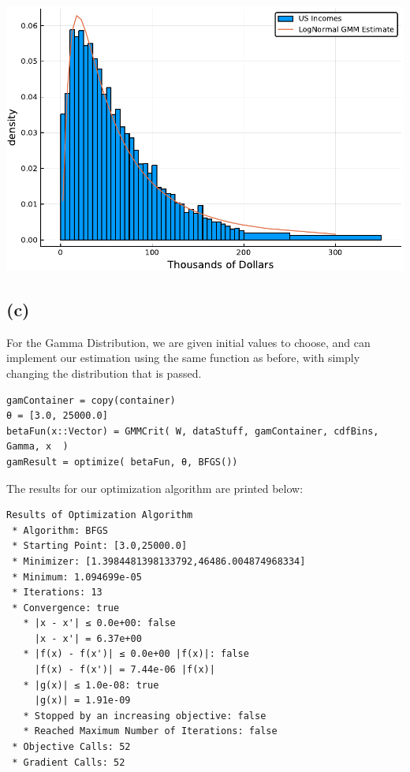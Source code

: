 \documentclass[12pt]{paper}
\begin{document}
\begin{centering}
  \includegraphics{loggyboy.pdf}
\end{centering}

\subsection{(c)}

For the Gamma Distribution, we are given initial values to choose, and
can implement our estimation using the same function as before, with
simply changing the distribution that is passed.

\begin{verbatim}
gamContainer = copy(container)
θ = [3.0, 25000.0]
betaFun(x::Vector) = GMMCrit( W, dataStuff, gamContainer, cdfBins, Gamma, x  )
gamResult = optimize( betaFun, θ, BFGS())
\end{verbatim}

The results for our optimization algorithm are printed below:

\begin{verbatim}
Results of Optimization Algorithm
 * Algorithm: BFGS
 * Starting Point: [3.0,25000.0]
 * Minimizer: [1.3984481398133792,46486.004874968334]
 * Minimum: 1.094699e-05
 * Iterations: 13
 * Convergence: true
   * |x - x'| ≤ 0.0e+00: false 
     |x - x'| = 6.37e+00 
   * |f(x) - f(x')| ≤ 0.0e+00 |f(x)|: false
     |f(x) - f(x')| = 7.44e-06 |f(x)|
   * |g(x)| ≤ 1.0e-08: true 
     |g(x)| = 1.91e-09 
   * Stopped by an increasing objective: false
   * Reached Maximum Number of Iterations: false
 * Objective Calls: 52
 * Gradient Calls: 52
\end{verbatim}
\end{document}
